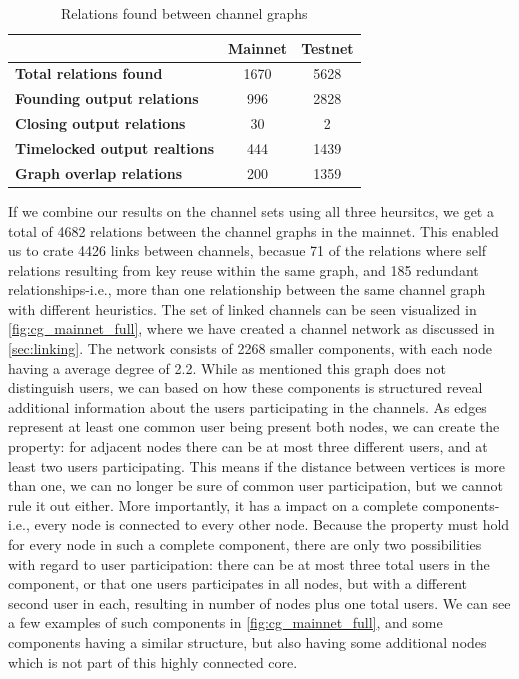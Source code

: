 \begin{table}[ht]
\centering
\caption{Relations found between channel graphs}
\label{table:connections}
\begin{tabular}{|l|c|c|}
\hline
                                       & \textbf{Mainnet} & \textbf{Testnet} \\ \hline
\textbf{Total relations found}       & 1670            & 5628             \\ \hline
\textbf{Founding output relations}   & 996               & 2828             \\ \hline
\textbf{Closing output relations}    & 30              & 2                \\ \hline
\textbf{Timelocked output realtions} & 444               & 1439             \\ \hline
\textbf{Graph overlap relations}     & 200               & 1359             \\ \hline
\end{tabular}
\end{table}

If we combine our results on the channel sets using all three heursitcs, we get a total of 4682 relations between the channel graphs in the mainnet. This enabled us to crate 4426 links between channels, becasue 71 of the relations where self relations resulting from key reuse within the same graph, and 185 redundant relationships-i.e., more than one relationship between the same channel graph with different heuristics. The set of linked channels can be seen visualized in \cref{fig:cg_mainnet_full}, where we have created a channel network as discussed in \cref{sec:linking}. The network consists of 2268 smaller components, with each node having a average degree of 2.2. While as mentioned this graph does not distinguish users, we can based on how these components is structured reveal additional information about the users participating in the channels. 
As edges represent at least one common user being present both nodes, we can create the property: for adjacent nodes there can be at most three different users, and at least two users participating. This means if the distance between vertices is more than one, we can no longer be sure of common user participation, but we cannot rule it out either. More importantly, it has a impact on a complete components-i.e., every node is connected to every other node. Because the property must hold for every node in such a complete component, there are only two possibilities with regard to user participation: there can be at most three total users in the component, or that one users participates in all nodes, but with a different second user in each, resulting in number of nodes plus one total users.
We can see a few examples of such components in \cref{fig:cg_mainnet_full}, and some components having a similar structure, but also having some additional nodes which is not part of this highly connected core.
\\



